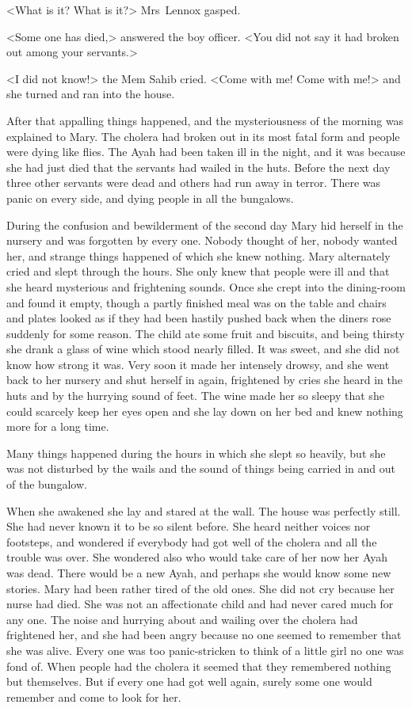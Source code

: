 <What is it? What is it?> Mrs~Lennox gasped.

<Some one has died,> answered the boy officer. <You did not say it had broken out among your servants.>

<I did not know!> the Mem Sahib cried. <Come with me! Come with me!> and she turned and ran into the house.

After that appalling things happened, and the mysteriousness of the morning was explained to Mary. The cholera had broken out in its most fatal form and people were dying like flies. The Ayah had been taken ill in the night, and it was because she had just died that the servants had wailed in the huts. Before the next day three other servants were dead and others had run away in terror. There was panic on every side, and dying people in all the bungalows.

During the confusion and bewilderment of the second day Mary hid herself in the nursery and was forgotten by every one. Nobody thought of her, nobody wanted her, and strange things happened of which she knew nothing. Mary alternately cried and slept through the hours. She only knew that people were ill and that she heard mysterious and frightening sounds. Once she crept into the dining-room and found it empty, though a partly finished meal was on the table and chairs and plates looked as if they had been hastily pushed back when the diners rose suddenly for some reason. The child ate some fruit and biscuits, and being thirsty she drank a glass of wine which stood nearly filled. It was sweet, and she did not know how strong it was. Very soon it made her intensely drowsy, and she went back to her nursery and shut herself in again, frightened by cries she heard in the huts and by the hurrying sound of feet. The wine made her so sleepy that she could scarcely keep her eyes open and she lay down on her bed and knew nothing more for a long time.

Many things happened during the hours in which she slept so heavily, but she was not disturbed by the wails and the sound of things being carried in and out of the bungalow.

When she awakened she lay and stared at the wall. The house was perfectly still. She had never known it to be so silent before. She heard neither voices nor footsteps, and wondered if everybody had got well of the cholera and all the trouble was over. She wondered also who would take care of her now her Ayah was dead. There would be a new Ayah, and perhaps she would know some new stories. Mary had been rather tired of the old ones. She did not cry because her nurse had died. She was not an affectionate child and had never cared much for any one. The noise and hurrying about and wailing over the cholera had frightened her, and she had been angry because no one seemed to remember that she was alive. Every one was too panic-stricken to think of a little girl no one was fond of. When people had the cholera it seemed that they remembered nothing but themselves. But if every one had got well again, surely some one would remember and come to look for her.

